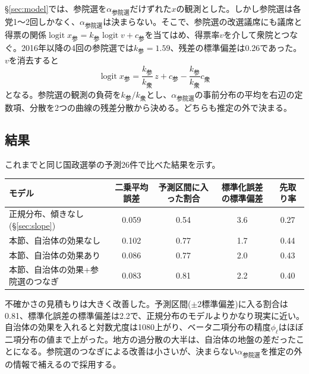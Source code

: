 \documentclass[a4paper,11pt]{ltjsarticle}
\begin{document}
\S\ref{sec:model}では、参院選を$\alpha_{\text{参院選}}$だけずれた$x$の観測とした。しかし参院選は各党1〜2回しかなく、$\alpha_{\text{参院選}}$は決まらない。そこで、参院選の改選議席にも議席と得票の関係$\operatorname{logit}x_{\text{参}}=k_{\text{参}}\operatorname{logit}v+c_{\text{参}}$を当てはめ、得票率$v$を介して衆院とつなぐ。2016年以降の4回の参院選では$k_{\text{参}}=1.59$、残差の標準偏差は0.26であった。$v$を消去すると
\begin{equation}
  \operatorname{logit}x_{\text{参}} = \frac{k_{\text{参}}}{k_{\text{衆}}}\,z + c_{\text{参}} - \frac{k_{\text{参}}}{k_{\text{衆}}}c_{\text{衆}}
\end{equation}
となる。参院選の観測の負荷を$k_{\text{参}}/k_{\text{衆}}$とし、$\alpha_{\text{参院選}}$の事前分布の平均を右辺の定数項、分散を2つの曲線の残差分散から決める。どちらも推定の外で決まる。

\subsection{結果}

これまでと同じ国政選挙の予測26件で比べた結果を示す。

\begin{table}[h]
\centering
\begin{tabular}{lcccc}
\hline
モデル & 二乗平均誤差 & 予測区間に入った割合 & 標準化誤差の標準偏差 & 先取り率 \\
\hline
正規分布、傾きなし(\S\ref{sec:slope}) & 0.059 & 0.54 & 3.6 & 0.27 \\
本節、自治体の効果なし & 0.102 & 0.77 & 1.7 & 0.44 \\
本節、自治体の効果あり & 0.086 & 0.77 & 2.0 & 0.43 \\
本節、自治体の効果+参院選のつなぎ & 0.083 & 0.81 & 2.2 & 0.40 \\
\hline
\end{tabular}
\end{table}

不確かさの見積もりは大きく改善した。予測区間($\pm2$標準偏差)に入る割合は0.81、標準化誤差の標準偏差は2.2で、正規分布のモデルよりかなり現実に近い。自治体の効果を入れると対数尤度は1080上がり、ベータ二項分布の精度$\phi_\ell$はほぼ二項分布の値まで上がった。地方の過分散の大半は、自治体の地盤の差だったことになる。参院選のつなぎによる改善は小さいが、決まらない$\alpha_{\text{参院選}}$を推定の外の情報で補えるので採用する。
\end{document}
